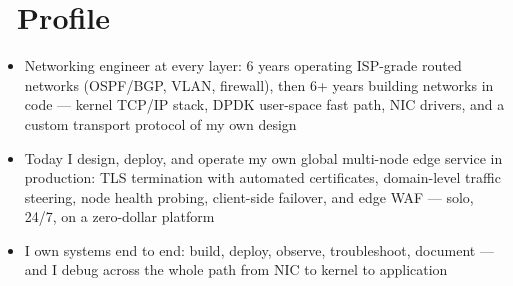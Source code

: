 \documentclass{resume}
\begin{document}



\section{\faRocket\ Profile}
\begin{itemize}[parsep=0.5ex]
	\item Networking engineer at every layer: 6 years operating ISP-grade routed networks (OSPF/BGP, VLAN, firewall), then 6+ years building networks in code --- kernel TCP/IP stack, DPDK user-space fast path, NIC drivers, and a custom transport protocol of my own design
	\item Today I design, deploy, and operate my own global multi-node edge service in production: TLS termination with automated certificates, domain-level traffic steering, node health probing, client-side failover, and edge WAF --- solo, 24/7, on a zero-dollar platform
	\item I own systems end to end: build, deploy, observe, troubleshoot, document --- and I debug across the whole path from NIC to kernel to application
\end{itemize}
\end{document}
